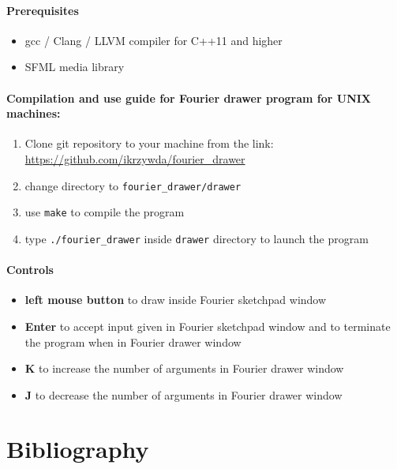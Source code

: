 \documentclass[titlepage]{article}
\begin{document}
    \paragraph{Prerequisites}
    \begin{itemize}
        \item gcc / Clang / LLVM compiler for C++11 and higher
        \item SFML media library
    \end{itemize}

    \paragraph{Compilation and use guide for Fourier drawer program for UNIX machines:}
    \begin{enumerate}
        \item Clone git repository to your machine from the link:
            \url{https://github.com/ikrzywda/fourier\_drawer}
        \item change directory to \texttt{fourier\_drawer/drawer}
        \item use \texttt{make} to compile the program
        \item type \texttt{./fourier\_drawer} inside \texttt{drawer} directory to launch
            the program
    \end{enumerate}

    \paragraph{Controls}
    \begin{itemize}
        \item \textbf{left mouse button} to draw inside Fourier sketchpad window
        \item \textbf{Enter} to accept input given in Fourier sketchpad window
            and to terminate the program when in Fourier drawer window
        \item \textbf{K} to increase the number of arguments in Fourier drawer 
            window
        \item \textbf{J} to decrease the number of arguments in Fourier drawer 
            window
    \end{itemize}

\section{Bibliography}
\end{document}
